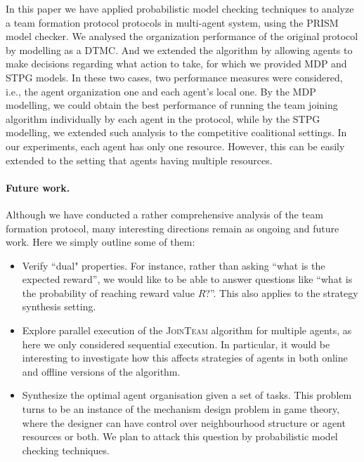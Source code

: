 \documentclass{llncs}
\begin{document}
In this paper we have applied probabilistic model checking techniques to analyze a team formation protocol protocols in multi-agent system, using the PRISM model checker. We analysed the organization performance of the original protocol by modelling as a DTMC. And we extended the algorithm by allowing agents to make decisions regarding what action to take, for which we provided MDP and STPG models. In these two cases, two performance measures were considered, i.e., the agent organization one and each agent's local one. By the MDP modelling, we could obtain the best performance
of running the team joining algorithm individually by each agent in the protocol, while by the STPG modelling, we extended such analysis to the competitive coalitional settings. In our experiments, each agent has only one resource. However, this can be easily extended to the setting that agents having multiple resources.

\paragraph{Future work.} Although we have conducted a rather comprehensive analysis of the team formation protocol, many interesting directions remain as ongoing and future work. Here we simply outline some of them:

\begin{itemize}
\item Verify ``dual" properties. For instance, rather than asking ``what is the expected reward'', we would like to be able to answer questions like ``what is the probability of reaching reward value $R$?''. This also applies to the strategy synthesis setting.

\item Explore parallel execution of the \textsc{JoinTeam} algorithm for multiple agents, as here we only considered sequential execution. %
    In particular, it would be interesting to investigate how this affects strategies of agents in both online and offline versions of the algorithm. %


 \item Synthesize the optimal agent organisation given a set of tasks. %
       This problem turns to be an instance of the mechanism design problem in game theory, where the designer can have control over neighbourhood structure or agent resources or both. We plan to attack this question by probabilistic model checking techniques.
\end{itemize}
\end{document}
